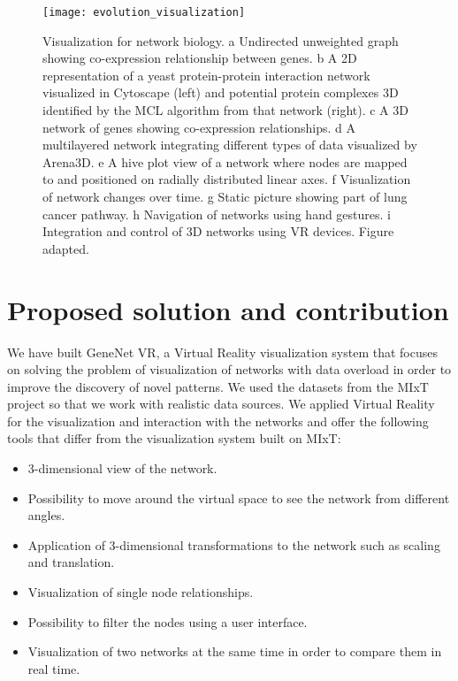 \begin{figure}[h!]
    \newlength{\tempheight}
    \setlength{\tempheight}{15ex}
    \centering%
    \texttt{[image: evolution\_visualization]}
    \caption{Visualization for network biology. a Undirected unweighted graph showing co-expression relationship between genes. b A 2D representation of a yeast protein-protein interaction network visualized in Cytoscape (left) and potential protein complexes 3D identified by the MCL algorithm from that network (right). c A 3D network of genes showing co-expression relationships. d A multilayered network integrating different types of data visualized by Arena3D. e A hive plot view of a network where nodes are mapped to and positioned on radially distributed linear axes. f Visualization of network changes over time. g Static picture showing part of lung cancer pathway. h Navigation of networks using hand gestures. i Integration and control of 3D networks using VR devices. Figure adapted\cite{pavlopoulos_malliarakis_papanikolaou_theodosiou_enright_iliopoulos_2015}.}
    \label{fig:network_biology_evolution}
\end{figure}%

\section{Proposed solution and contribution}
We have built GeneNet VR, a Virtual Reality visualization system that focuses on solving the problem of visualization of networks with data overload in order to improve the discovery of novel patterns. We used the datasets from the MIxT project so that we work with realistic data sources. We applied Virtual Reality for the visualization and interaction with the networks and offer the following tools that differ from the visualization system built on MIxT:

\begin{itemize}
  \item 3-dimensional view of the network.
  \item Possibility to move around the virtual space to see the network from different angles.
  \item Application of 3-dimensional transformations to the network such as scaling and translation.
  \item Visualization of single node relationships.
  \item Possibility to filter the nodes using a user interface.
  \item Visualization of two networks at the same time in order to compare them in real time.
\end{itemize}

